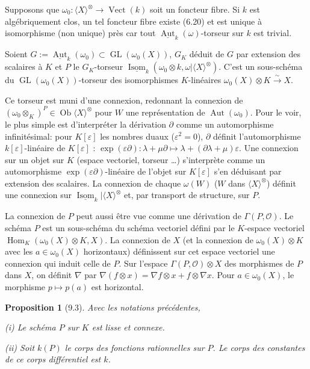 \documentclass[12pt,a4paper]{article}
\theoremstyle{plain}
\newtheorem{proposition}[theorem]{Proposition}
\theoremstyle{definition}
\DeclareMathOperator{\Hom}{Hom}
\DeclareMathOperator{\Aut}{Aut}
\DeclareMathOperator{\Isom}{Isom}
\DeclareMathOperator{\Vect}{Vect}
\DeclareMathOperator{\GL}{GL}
\DeclareMathOperator{\Ob}{Ob}
\begin{document}
Supposons que $\omega_0 : \langle X \rangle^\otimes \to \Vect(k)$ soit un foncteur fibre. Si $k$ est algébriquement clos, un tel foncteur fibre existe (6.20) et est unique à isomorphisme (non unique) près car tout $\underline{\Aut}_k(\omega)$-torseur sur $k$ est trivial.

Soient $G := \underline{\Aut}_k(\omega_0) \subset \GL(\omega_0(X))$, $G_K$ déduit de $G$ par extension des scalaires à $K$ et $P$ le $G_K$-torseur $\underline{\Isom}_k(\omega_0 \otimes k, \omega | \langle X \rangle^\otimes)$. C'est un sous-schéma du $\GL(\omega_0(X))$-torseur des isomorphismes $K$-linéaires $\omega_0(X) \otimes K \xrightarrow{\sim} X$.

Ce torseur est muni d'une connexion, redonnant la connexion de $(\omega_0 \otimes_K)^P \in \Ob \langle X \rangle^\otimes$ pour $W$ une représentation de $\Aut(\omega_0)$. Pour le voir, le plus simple est d'interpréter la dérivation $\partial$ comme un automorphisme infinitésimal: pour $K[\varepsilon]$ les nombres duaux ($\varepsilon^2 = 0$), $\partial$ définit l'automorphisme $k[\varepsilon]$-linéaire de $K[\varepsilon]$ : $\exp(\varepsilon\partial) : \lambda + \mu \partial \mapsto \lambda + (\partial\lambda + \mu)\varepsilon$. Une connexion sur un objet sur $K$ (espace vectoriel, torseur \ldots) s'interprète comme un automorphisme $\exp(\varepsilon\partial)$-linéaire de l'objet sur $K[\varepsilon]$ s'en déduisant par extension des scalaires. La connexion de chaque $\omega(W)$ ($W$ dans $\langle X \rangle^\otimes$) définit une connexion sur $\underline{\Isom}_k | \langle X \rangle^\otimes$ et, par transport de structure, sur $P$.

La connexion de $P$ peut aussi être vue comme une dérivation de $\Gamma(P, \mathcal{O})$. Le schéma $P$ est un sous-schéma du schéma vectoriel défini par le $K$-espace vectoriel $\Hom_K(\omega_0(X) \otimes K, X)$. La connexion de $X$ (et la connexion de $\omega_0(X) \otimes K$ avec les $a \in \omega_0(X)$ horizontaux) définissent sur cet espace vectoriel une connexion qui induit celle de $P$. Sur l'espace $\Gamma(P, \mathcal{O}) \otimes X$ des morphismes de $P$ dans $X$, on définit $\nabla$ par $\nabla(f \otimes x) = \nabla f \otimes x + f \otimes \nabla x$. Pour $a \in \omega_0(X)$, le morphisme $p \mapsto p(a)$ est horizontal.

\begin{proposition}[9.3]
Avec les notations précédentes,

\textup{(i)} Le schéma $P$ sur $K$ est lisse et connexe.

\textup{(ii)} Soit $k(P)$ le corps des fonctions rationnelles sur $P$. Le corps des constantes de ce corps différentiel est $k$.
\end{proposition}
\end{document}
